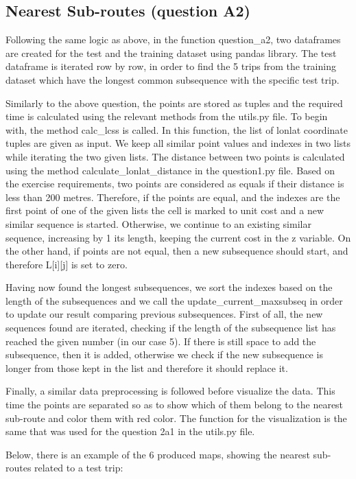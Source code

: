 \documentclass[12pt]{article}
\begin{document}
	\subsection{Nearest Sub-routes (question A2)}
	Following the same logic as above, in the function question\_a2, two dataframes are created for the test and the training dataset using pandas library. The test dataframe is iterated row by row, in order to find the 5 trips from the training dataset which have the longest common subsequence with the specific test trip.
	
	Similarly to the above question, the points are stored as tuples and the required time is calculated using the relevant methods from the utils.py file. To begin with, the method calc\_lcss is called. In this function, the list of lonlat coordinate tuples are given as input. We keep all similar point values and indexes in two lists while iterating the two given lists. The distance between two points is calculated using the method calculate\_lonlat\_distance in the question1.py file. Based on the exercise requirements, two points are considered as equals if their distance is less than 200 metres. Therefore, if the points are equal, and the indexes are the first point of one of the given lists the cell is marked to unit cost and a new similar sequence is started. Otherwise, we continue to an existing similar sequence, increasing by 1 its length, keeping the current cost in the z variable. On the other hand, if points are not equal, then a new subsequence should start, and therefore L[i][j] is set to zero.
	
	Having now found the longest subsequences, we sort the indexes based on the length of the subsequences and we call the update\_current\_maxsubseq in order to update our result comparing previous subsequences. First of all, the new sequences found are iterated, checking if the length of the subsequence list has reached the given number (in our case 5). If there is still space to add the subsequence, then it is added, otherwise we check if the new subsequence is longer from those kept in the list and therefore it should replace it.
	
	Finally, a similar data preprocessing is followed before visualize the data. This time the points are separated so as to show which of them belong to the nearest sub-route and color them with red color. The function for the visualization is the same that was used for the question 2a1 in the utils.py file.
	
	Below, there is an example of the 6 produced maps, showing the nearest sub-routes related to a test trip:
	
\end{document}
